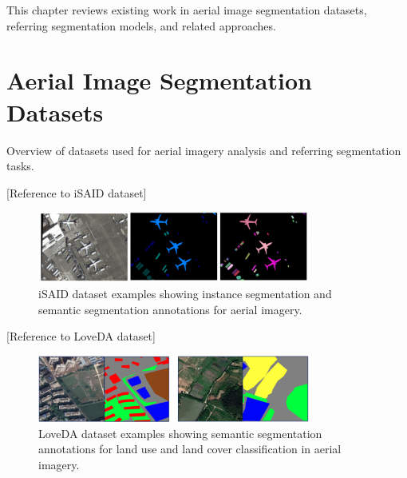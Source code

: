 \cleardoublepage
\label{chap:architecture}

This chapter reviews existing work in aerial image segmentation datasets, referring segmentation models, and related approaches.

\section{Aerial Image Segmentation Datasets}

Overview of datasets used for aerial imagery analysis and referring segmentation tasks.

[Reference to iSAID dataset] %

\begin{figure}[htbp]
\centering
\includegraphics[width=0.8\textwidth]{../Images/isaid_examples.png}
\caption{iSAID dataset examples showing instance segmentation and semantic segmentation annotations for aerial imagery.}
\label{fig:isaid_examples}
\end{figure}

[Reference to LoveDA dataset] %

\begin{figure}[htbp]
\centering
\includegraphics[width=0.8\textwidth]{../Images/loveda.png}
\caption{LoveDA dataset examples showing semantic segmentation annotations for land use and land cover classification in aerial imagery.}
\label{fig:loveda_examples}
\end{figure}


